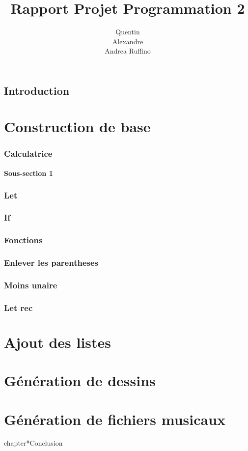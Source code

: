 \documentclass{report}
\title{\textbf{Rapport Projet Programmation 2}}
\author{
	\bsc {Menini} Quentin\\
	\bsc {Brebant} Alexandre\\
	\bsc {Randriamalazavola} Andrea Ruffino}
\begin{document}
\maketitle

\tableofcontents

\chapter*{Introduction}

\part{Construction de base}

\section{Calculatrice}
\subsection{Sous-section 1}

\section{Let}

\section{If}

\section{Fonctions}

\section{Enlever les parentheses}

\section{Moins unaire}

\section{Let rec}

\part{Ajout des listes}
\part{Génération de dessins}
\part{Génération de fichiers musicaux}

chapter*{Conclusion}
\end{document}
